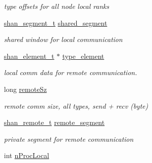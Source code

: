 \begin{DoxyCompactItemize}
\begin{DoxyCompactList}\small\item\em type offsets for all node local ranks \end{DoxyCompactList}\item 
\hyperlink{structshan__segment__t}{shan\+\_\+segment\+\_\+t} \hyperlink{structshan__neighborhood__t_a6327fe11775d0b3ed3c256865f5cd52c}{shared\+\_\+segment}\hypertarget{structshan__neighborhood__t_a6327fe11775d0b3ed3c256865f5cd52c}{}\label{structshan__neighborhood__t_a6327fe11775d0b3ed3c256865f5cd52c}

\begin{DoxyCompactList}\small\item\em shared window for local communication \end{DoxyCompactList}\item 
\hyperlink{structshan__element__t}{shan\+\_\+element\+\_\+t} $\ast$ \hyperlink{structshan__neighborhood__t_a30a4cb5c30b44753136a36ca493fcf19}{type\+\_\+element}\hypertarget{structshan__neighborhood__t_a30a4cb5c30b44753136a36ca493fcf19}{}\label{structshan__neighborhood__t_a30a4cb5c30b44753136a36ca493fcf19}

\begin{DoxyCompactList}\small\item\em local comm data for remote communication. \end{DoxyCompactList}\item 
long \hyperlink{structshan__neighborhood__t_a4e8665c692837d5851b87fb6d843f71c}{remote\+Sz}\hypertarget{structshan__neighborhood__t_a4e8665c692837d5851b87fb6d843f71c}{}\label{structshan__neighborhood__t_a4e8665c692837d5851b87fb6d843f71c}

\begin{DoxyCompactList}\small\item\em remote comm size, all types, send + recv (byte) \end{DoxyCompactList}\item 
\hyperlink{structshan__remote__t}{shan\+\_\+remote\+\_\+t} \hyperlink{structshan__neighborhood__t_a570ccb16f2652f23e733c69d8bb3022a}{remote\+\_\+segment}\hypertarget{structshan__neighborhood__t_a570ccb16f2652f23e733c69d8bb3022a}{}\label{structshan__neighborhood__t_a570ccb16f2652f23e733c69d8bb3022a}

\begin{DoxyCompactList}\small\item\em private segment for remote communication \end{DoxyCompactList}\item 
int \hyperlink{structshan__neighborhood__t_a4d30862e28f83fda7d13027d65027421}{n\+Proc\+Local}\hypertarget{structshan__neighborhood__t_a4d30862e28f83fda7d13027d65027421}{}\label{structshan__neighborhood__t_a4d30862e28f83fda7d13027d65027421}


\end{DoxyCompactItemize}

